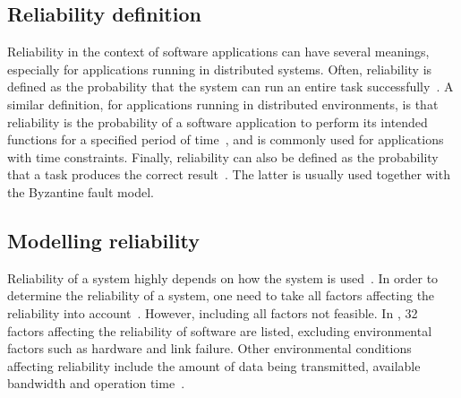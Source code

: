 \documentclass{cslthse-msc}
\begin{document}
\subsection{Reliability definition} \label{subsec:background_reliability_definition}
Reliability in the context of software applications can have several meanings, especially for applications running in distributed systems. Often, reliability is defined as the probability that the system can run an entire task successfully~\cite{taskAllocation, relModelDistSimSystem, studyServiceRel, hierarchicalRelModeling, generalAlgoRelEval, realTimeRelAnalysis, perfRelNonMarkovian}. A similar definition, for applications running in distributed environments, is that reliability is the probability of a software application to perform its intended functions for a specified period of time~\cite{surveyReliabilityDistr, surveyRelPrediction, relDistApplications}, and is commonly used for applications with time constraints. Finally, reliability can also be defined as the probability that a task produces the correct result~\cite{surveyRelPrediction, relAndPerfGridServices, relGridServicePredConstraint, relModelWebServices, selfAdaptRel}. The latter is usually used together with the Byzantine fault model. 

\subsection{Modelling reliability} \label{subsec:background_modelling_rel}
Reliability of a system highly depends on how the system is used~\cite{surveyRelPrediction}. In order to determine the reliability of a system, one need to take all factors affecting the reliability into account~\cite{surveyReliabilityDistr}. However, including all factors not feasible. In \cite{factorsAffectingRel}, 32 factors affecting the reliability of software are listed, excluding environmental factors such as hardware and link failure. Other environmental conditions affecting reliability include the amount of data being transmitted, available bandwidth and operation time~\cite{cloudServiceRel, hierarchicalRelModeling}.
\end{document}
